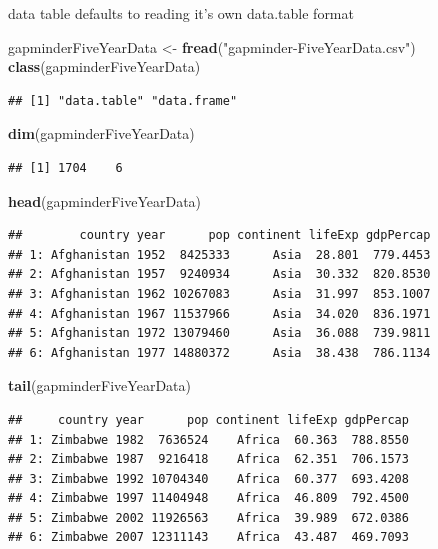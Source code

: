 \documentclass[]{article}
\newenvironment{Shaded}{\begin{snugshade}}{\end{snugshade}}
\newcommand{\KeywordTok}[1]{\textcolor[rgb]{0.13,0.29,0.53}{\textbf{{#1}}}}
\newcommand{\StringTok}[1]{\textcolor[rgb]{0.31,0.60,0.02}{{#1}}}
\newcommand{\NormalTok}[1]{{#1}}
\begin{document}
data table defaults to reading it's own data.table format

\begin{Shaded}
\begin{Highlighting}[]
\NormalTok{gapminderFiveYearData <-}\StringTok{ }\KeywordTok{fread}\NormalTok{(}\StringTok{"gapminder-FiveYearData.csv"}\NormalTok{)}
\KeywordTok{class}\NormalTok{(gapminderFiveYearData)}
\end{Highlighting}
\end{Shaded}

\begin{verbatim}
## [1] "data.table" "data.frame"
\end{verbatim}

\begin{Shaded}
\begin{Highlighting}[]
\KeywordTok{dim}\NormalTok{(gapminderFiveYearData)}
\end{Highlighting}
\end{Shaded}

\begin{verbatim}
## [1] 1704    6
\end{verbatim}

\begin{Shaded}
\begin{Highlighting}[]
\KeywordTok{head}\NormalTok{(gapminderFiveYearData)}
\end{Highlighting}
\end{Shaded}

\begin{verbatim}
##        country year      pop continent lifeExp gdpPercap
## 1: Afghanistan 1952  8425333      Asia  28.801  779.4453
## 2: Afghanistan 1957  9240934      Asia  30.332  820.8530
## 3: Afghanistan 1962 10267083      Asia  31.997  853.1007
## 4: Afghanistan 1967 11537966      Asia  34.020  836.1971
## 5: Afghanistan 1972 13079460      Asia  36.088  739.9811
## 6: Afghanistan 1977 14880372      Asia  38.438  786.1134
\end{verbatim}

\begin{Shaded}
\begin{Highlighting}[]
\KeywordTok{tail}\NormalTok{(gapminderFiveYearData)}
\end{Highlighting}
\end{Shaded}

\begin{verbatim}
##     country year      pop continent lifeExp gdpPercap
## 1: Zimbabwe 1982  7636524    Africa  60.363  788.8550
## 2: Zimbabwe 1987  9216418    Africa  62.351  706.1573
## 3: Zimbabwe 1992 10704340    Africa  60.377  693.4208
## 4: Zimbabwe 1997 11404948    Africa  46.809  792.4500
## 5: Zimbabwe 2002 11926563    Africa  39.989  672.0386
## 6: Zimbabwe 2007 12311143    Africa  43.487  469.7093
\end{verbatim}
\end{document}
